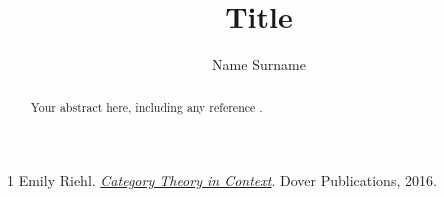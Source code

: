 \documentclass[a4paper,10pt]{easychair}
\title{Title}
\author{Name Surname}
\institute{Affiliation}
\begin{document}
\maketitle

\begin{abstract}
Your abstract here, including any reference \cite{riehl}.
\end{abstract}

\begin{thebibliography}{1}
Emily Riehl.
\href{https://math.jhu.edu/~eriehl/context/}{\emph{Category Theory in Context}}.
Dover Publications, 2016.
\end{thebibliography}
\end{document}

